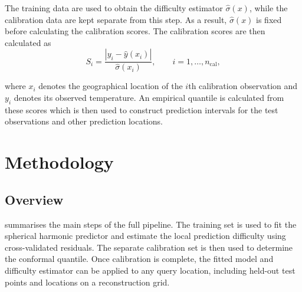 \documentclass[11pt,a4paper]{report}
\begin{document}
The training data are used to obtain the difficulty estimator $\hat{\sigma}(x)$, while the calibration data are kept separate from this step. As a result, $\hat{\sigma}(x)$ is fixed before calculating the calibration scores. The calibration scores are then calculated as
\begin{equation}
S_i =
\frac{|y_i-\hat{y}(x_i)|}
{\hat{\sigma}(x_i)},
\qquad i=1,\ldots,n_{\mathrm{cal}},
\end{equation}

where $x_i$ denotes the geographical location of the $i$th calibration observation and $y_i$ denotes its observed temperature. An empirical quantile is calculated from these scores which is then used to construct prediction intervals for the test observations and other prediction locations.



\chapter{Methodology}
\label{ch:methodology}

\section{Overview}

 summarises the main steps of the full pipeline. The training set is used to fit the spherical harmonic predictor and estimate the local prediction difficulty using cross-validated residuals. The separate calibration set is then used to determine the conformal quantile. Once calibration is complete, the fitted model and difficulty estimator can be applied to any query location, including held-out test points and locations on a reconstruction grid.
\end{document}
